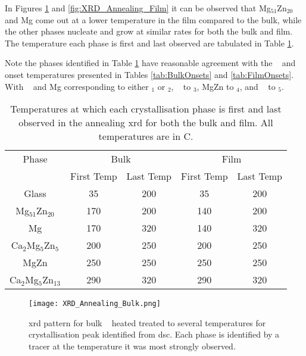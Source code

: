 \documentclass[draft,a4paper,12pt,oneside]{article}%
\begin{document}
In Figures \ref{fig:XRD_Annealing_Bulk} and \ref{fig:XRD_Annealing_Film} it can be observed that Mg$_{51}$Zn$_{20}$ and Mg come out at a lower temperature in the film compared to the bulk, while the other phases nucleate and grow at similar rates for both the bulk and film. The temperature each phase is first and last observed are tabulated in Table \ref{tab:Crystal_Sequence}. 

Note the phases identified in Table \ref{tab:Crystal_Sequence} have reasonable agreement with the \Tg~ and \Tx~ onset temperatures presented in Tables \ref{tab:BulkOnsets} and \ref{tab:FilmOnsets}. With \MgZn~ and Mg corresponding to either \Tx $_{1}$ or \Tx $_{2}$, \CaMgZnFive~ to \Tx$_{3}$, MgZn to \Tx$_{4}$, and \CaMgZnThirteen~ to \Tx$_{5}$.

\begin{table}[h]
	\centering
	\caption{Temperatures at which each crystallisation phase is first and last observed in the annealing \acrshort{xrd} for both the bulk and film. All temperatures are in \degree C.}
	\begin{tabular}{ c c c c c }
		\toprule
		Phase & \multicolumn{2}{c}{Bulk} & \multicolumn{2}{c}{Film}                 \\
		& First Temp & Last Temp & First Temp & Last Temp \\
		\midrule
		Glass 						& 35 & 200 & 35 & 200 \\
		Mg$_{51}$Zn$_{20}$ \cite{Zhang2013, Khan1989} & 170 & 200 & 140 & 200 \\
		Mg 							& 170 & 320 & 140 & 320 \\
		Ca$_{2}$Mg$_{5}$Zn$_{5}$ \cite{Zhang2013, Cao2016} & 200 & 250 & 200 & 250 \\
		MgZn \cite{Khan1989} & 250 & 250 & 250 & 250 \\
		Ca$_{2}$Mg$_{5}$Zn$_{13}$ \cite{Zhang2013, Zhang2012, Zhang2011} & 290 & 320 & 290 & 320 \\
		\bottomrule
	\end{tabular}
	\label{tab:Crystal_Sequence}
\end{table}

\begin{figure}[b]
	\centering
	\texttt{[image: XRD\_Annealing\_Bulk.png]}
	\caption[Table of contents Capition]{\acrshort{xrd} pattern for bulk \MgZnCa~ heated treated to several temperatures for crystallisation peak identified from \acrshort{dsc}. Each phase is identified by a tracer at the temperature it was most strongly observed.}
	\label{fig:XRD_Annealing_Bulk}
\end{figure}
\end{document}
